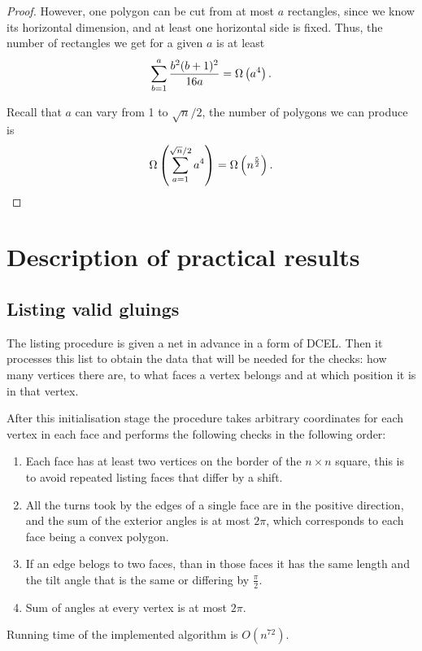 \documentclass[a4paper,11pt]{article}
\begin{document}
\begin{proof}
However, one polygon can be cut from at most $a$ rectangles, since we know its horizontal dimension, and at least one horizontal side is fixed. Thus, the number of rectangles we get for a given $a$ is at least
\[ \sum\limits_{b=1}^a \frac{b^2 (b+1)^2}{16a} = \Omega\left( a^4 \right). \]

Recall that $a$ can vary from 1 to $\sqrt n / 2$, the number of polygons we can produce is
\[ \Omega \left( \sum\limits_{a=1}^{\sqrt n / 2} a^4 \right) = \Omega \left( n^\frac{5}{2} \right). \]

\end{proof}

\section{Description of practical results}

\subsection{Listing valid gluings}

The listing procedure is given a net in advance in a form of DCEL. Then it processes this list to obtain the data that will be needed for the checks: how many vertices there are, to what faces a vertex belongs and at which position it is in that vertex.

After this initialisation stage the procedure takes arbitrary coordinates for each vertex in each face and performs the following checks in the following order:

\begin{enumerate}
	\item Each face has at least two vertices on the border of the $n \times n$ square, this is to avoid repeated listing faces that differ by a shift.
	\item All the turns took by the edges of a single face are in the positive direction, and the sum of the exterior angles is at most $2 \pi$, which corresponds to each face being a convex polygon.
	\item If an edge belogs to two faces, than in those faces it has the same length and the tilt angle that is the same or differing by $\frac{\pi}{2}$.
	\item Sum of angles at every vertex is at most $2 \pi$.
\end{enumerate}

\begin{theorem}
	Running time of the implemented algorithm is $O(n^{72})$.
\end{theorem}
\end{document}
